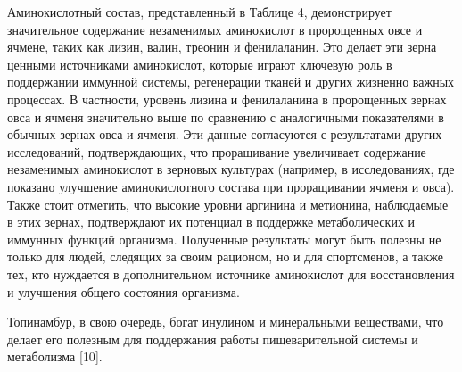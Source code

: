 
Аминокислотный состав, представленный в Таблице 4, демонстрирует
значительное содержание незаменимых аминокислот в пророщенных овсе и
ячмене, таких как лизин, валин, треонин и фенилаланин. Это делает эти
зерна ценными источниками аминокислот, которые играют ключевую роль в
поддержании иммунной системы, регенерации тканей и других жизненно
важных процессах. В частности, уровень лизина и фенилаланина в
пророщенных зернах овса и ячменя значительно выше по сравнению с
аналогичными показателями в обычных зернах овса и ячменя. Эти данные
согласуются с результатами других исследований, подтверждающих, что
проращивание увеличивает содержание незаменимых аминокислот в зерновых
культурах (например, в исследованиях, где показано улучшение
аминокислотного состава при проращивании ячменя и овса). Также стоит
отметить, что высокие уровни аргинина и метионина, наблюдаемые в этих
зернах, подтверждают их потенциал в поддержке метаболических и иммунных
функций организма. Полученные результаты могут быть полезны не только
для людей, следящих за своим рационом, но и для спортсменов, а также
тех, кто нуждается в дополнительном источнике аминокислот для
восстановления и улучшения общего состояния организма.

Топинамбур, в свою очередь, богат инулином и минеральными веществами,
что делает его полезным для поддержания работы пищеварительной системы и
метаболизма {[}10{]}.

